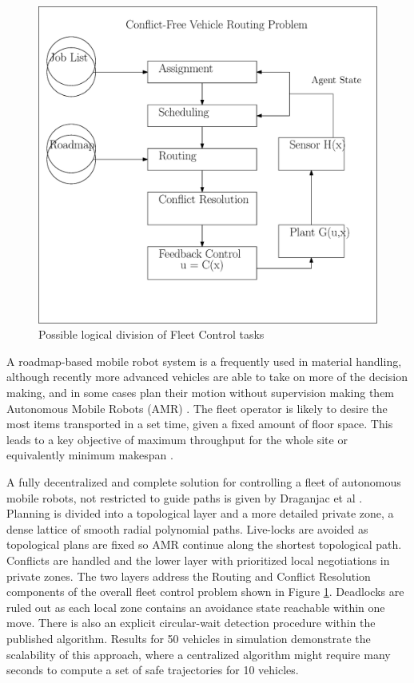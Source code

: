 \documentclass[runningheads]{llncs}
\begin{document}
\begin{figure}[htbp]
\centerline{\includegraphics[width=0.7\linewidth]{dcfvrp_logical_blocks.eps}}
\caption{Possible logical division of Fleet Control tasks}
\label{fig:logical_blocks}
\end{figure}
A roadmap-based mobile robot system is a frequently used in material handling, although recently more advanced vehicles are able to take on more of the decision making, and in some cases plan their motion without supervision making them Autonomous Mobile Robots (AMR) \cite{Fragapane2021}. The fleet operator is likely to desire the most items transported in a set time, given a fixed amount of floor space. This leads to a key objective of maximum throughput for the whole site or equivalently minimum makespan \cite{Lamballais2017}.    

A fully decentralized and complete solution for controlling a fleet of autonomous mobile robots, not restricted to guide paths is given by Draganjac et al \cite{Draganjac2020}. Planning is divided into a topological layer and a more detailed private zone, a dense lattice of smooth radial polynomial paths. Live-locks are avoided as topological plans are fixed so AMR continue along the shortest topological path. Conflicts are handled and the lower layer with prioritized local negotiations in private zones. The two layers address the Routing and Conflict Resolution components of the overall fleet control problem shown in Figure \ref{fig:logical_blocks}. Deadlocks are ruled out as each local zone contains an avoidance state reachable within one move. There is also an explicit circular-wait detection procedure within the published algorithm. Results for 50 vehicles in simulation demonstrate the scalability of this approach, where a centralized algorithm might require many seconds to compute a set of safe trajectories for 10 vehicles. 
\end{document}
